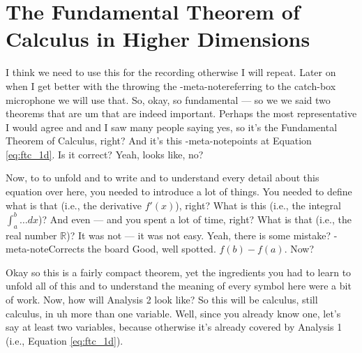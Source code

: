 \section{The Fundamental Theorem of Calculus in Higher Dimensions}

\begin{spoken-clean}[00:05:30 - 00:06:23]
I think we need to use this for the recording otherwise I will repeat. Later on when I get better with the throwing the \inline-meta-note{referring to the catch-box microphone} we will use that. So, okay, so fundamental --- so we we said two theorems that are um that are indeed important. Perhaps the most representative I would agree and and I saw many people saying yes, so it's the Fundamental Theorem of Calculus, right? And it's this \inline-meta-note{points at Equation \eqref{eq:ftc_1d}}. Is it correct? Yeah, looks like, no?

Now, to to unfold and to write and to understand every detail about this equation over here, you needed to introduce a lot of things. You needed to define what is that (i.e., the derivative $f'(x)$), right? What is this (i.e., the integral $\int_a^b \dots dx$)? And even --- and you spent a lot of time, right? What is that (i.e., the real number $\mathbb{R}$)? It was not --- it was not easy. Yeah, there is some mistake? \inline-meta-note{Corrects the board} Good, well spotted. $f(b) - f(a)$. Now? 

Okay so this is a fairly compact theorem, yet the ingredients you had to learn to unfold all of this and to understand the meaning of every symbol here were a bit of work. Now, how will Analysis 2 look like? So this will be calculus, still calculus, in uh more than one variable. Well, since you already know one, let's say at least two variables, because otherwise it's already covered by Analysis 1 (i.e., Equation \ref{eq:ftc_1d}).
\end{spoken-clean}

